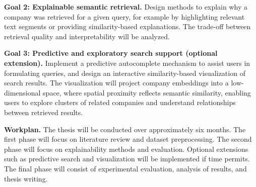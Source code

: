 \documentclass[a4paper]{scrartcl}
\begin{document}

\noindent \textbf{Goal 2: Explainable semantic retrieval.} Design methods to explain why a company was retrieved for a given query, for example by highlighting relevant text segments or providing similarity-based explanations. The trade-off between retrieval quality and interpretability will be analyzed.

\noindent \textbf{Goal 3: Predictive and exploratory search support (optional extension).} Implement a predictive autocomplete mechanism to assist users in formulating queries, and design an interactive similarity-based visualization of search results. The visualization will project company embeddings into a low-dimensional space, where spatial proximity reflects semantic similarity, enabling users to explore clusters of related companies and understand relationships between retrieved results.


\noindent \textbf{Workplan.} The thesis will be conducted over approximately six months. The first phase will focus on literature review and dataset preprocessing. The second phase will focus on explainability methods and evaluation. Optional extensions such as predictive search and visualization will be implemented if time permits. The final phase will consist of experimental evaluation, analysis of results, and thesis writing.
\end{document}
